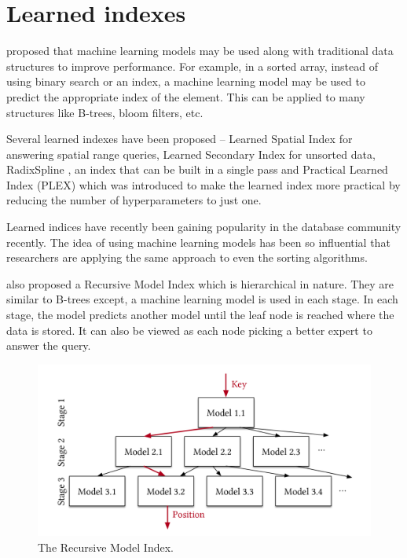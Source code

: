 \section{Learned indexes}

\citet{kraska2018} proposed that machine learning models may be used along with
traditional data structures to improve performance. For example, in a sorted
array, instead of using binary search or an index, a machine learning model may
be used to predict the appropriate index of the element. This can be applied to
many structures like B-trees, bloom filters, etc.

Several learned indexes have been proposed -- Learned Spatial Index
\cite{pandeyCaseLearnedSpatial2020} for answering spatial range queries, Learned
Secondary Index \cite{kipfLSILearnedSecondary2022} for unsorted data,
RadixSpline \cite{kipfRadixSplineSinglePassLearned2020}, an index that can be
built in a single pass and Practical Learned Index (PLEX)
\cite{stoianPracticalLearnedIndexing2021} which was introduced to make the
learned index more practical by reducing the number of hyperparameters to just
one.

Learned indices have recently been gaining popularity in the database community
recently. The idea of using machine learning models has been so influential that
researchers are applying the same approach to even the sorting algorithms.
\cite{kristoCaseLearnedSorting2020}

\citet{kraska2018} also proposed a Recursive Model Index which is hierarchical
in nature. They are similar to B-trees except, a machine learning model is used
in each stage. In each stage, the model predicts another model until the leaf
node is reached where the data is stored. It can also be viewed as each node
picking a better expert to answer the query.

\begin{figure}[h]
      \centering
      \includegraphics[width=1.0\textwidth]{RMI.png}
      \caption[Recursive Model Index]{The Recursive Model Index.
            \cite{kraska2018}}
\end{figure}
